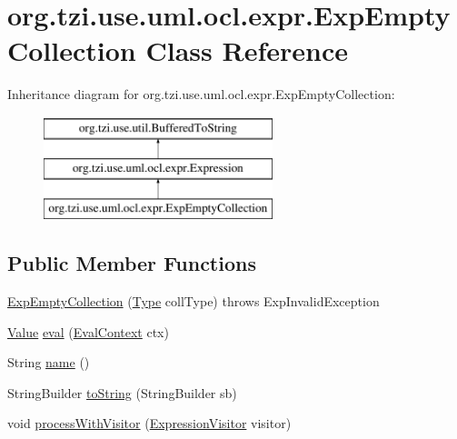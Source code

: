 \hypertarget{classorg_1_1tzi_1_1use_1_1uml_1_1ocl_1_1expr_1_1_exp_empty_collection}{\section{org.\-tzi.\-use.\-uml.\-ocl.\-expr.\-Exp\-Empty\-Collection Class Reference}
\label{classorg_1_1tzi_1_1use_1_1uml_1_1ocl_1_1expr_1_1_exp_empty_collection}
}
Inheritance diagram for org.\-tzi.\-use.\-uml.\-ocl.\-expr.\-Exp\-Empty\-Collection\-:\begin{figure}[H]
\begin{center}
\leavevmode
\includegraphics[height=3.000000cm]{classorg_1_1tzi_1_1use_1_1uml_1_1ocl_1_1expr_1_1_exp_empty_collection}
\end{center}
\end{figure}
\subsection*{Public Member Functions}
\begin{DoxyCompactItemize}
\item 
\hyperlink{classorg_1_1tzi_1_1use_1_1uml_1_1ocl_1_1expr_1_1_exp_empty_collection_aa8d12da55346d81bf356d97ceac7384d}{Exp\-Empty\-Collection} (\hyperlink{interfaceorg_1_1tzi_1_1use_1_1uml_1_1ocl_1_1type_1_1_type}{Type} coll\-Type)  throws Exp\-Invalid\-Exception     
\item 
\hyperlink{classorg_1_1tzi_1_1use_1_1uml_1_1ocl_1_1value_1_1_value}{Value} \hyperlink{classorg_1_1tzi_1_1use_1_1uml_1_1ocl_1_1expr_1_1_exp_empty_collection_aef42324cfa38bc3b36f558486c75b1a1}{eval} (\hyperlink{classorg_1_1tzi_1_1use_1_1uml_1_1ocl_1_1expr_1_1_eval_context}{Eval\-Context} ctx)
\item 
String \hyperlink{classorg_1_1tzi_1_1use_1_1uml_1_1ocl_1_1expr_1_1_exp_empty_collection_aa24142e4d3b7465ab9dc854873ae4d29}{name} ()
\item 
String\-Builder \hyperlink{classorg_1_1tzi_1_1use_1_1uml_1_1ocl_1_1expr_1_1_exp_empty_collection_a30221a631d52b02bd549b0ebff0ebbd6}{to\-String} (String\-Builder sb)
\item 
void \hyperlink{classorg_1_1tzi_1_1use_1_1uml_1_1ocl_1_1expr_1_1_exp_empty_collection_a6ea29343b1e6cd3ec05dcf94b4ec6013}{process\-With\-Visitor} (\hyperlink{interfaceorg_1_1tzi_1_1use_1_1uml_1_1ocl_1_1expr_1_1_expression_visitor}{Expression\-Visitor} visitor)
\end{DoxyCompactItemize}
